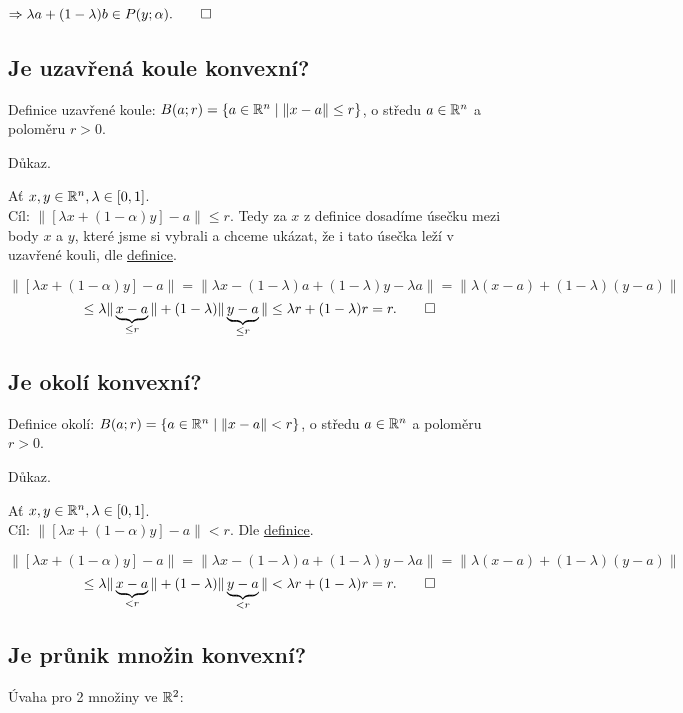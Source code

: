 $\Rightarrow \lambda a + (1-\lambda)b \in P(y; \alpha). \qed$

\subsection{Je uzavřená koule konvexní?}
Definice uzavřené koule: $B(a; r) = \left\lbrace a \in \mathbb{R}^n \mid \|x -a \| \leq r \right\rbrace$, o středu $a \in \mathbb{R}^n$ a poloměru $r > 0$.

Důkaz.

Ať $x,y \in \mathbb{R}^n, \lambda \in [0,1]$.\\
Cíl: $\| [\lambda x + (1-\alpha)y] - a \| \leq r$. Tedy za $x$ z definice dosadíme úsečku mezi body $x$ a $y$, které 
jsme si vybrali a chceme ukázat, že i tato úsečka leží v uzavřené kouli, dle \hyperref[sec:konvex]{definice}.

\[
    \| [\lambda x + (1-\alpha)y] - a \| = \| \lambda x - (1-\lambda)a + (1-\lambda)y - \lambda a \| =
    \| \lambda (x-a) + (1-\lambda)(y-a) \|
\]
\[
    \leq \lambda \|\underbrace{x-a}_{\leq r}\| +  (1-\lambda)\|\underbrace{y-a}_{\leq r}\| \leq \lambda r + (1-\lambda)r
     = r. \qed
\]

\subsection{Je okolí konvexní?}
Definice okolí: $B(a;r) = \left\lbrace a \in \mathbb{R}^n \mid \|x -a \| < r \right\rbrace$, o středu $a \in \mathbb{R}^n$ a poloměru $r > 0$.

Důkaz.

Ať $x,y \in \mathbb{R}^n, \lambda \in [0,1]$.\\
Cíl: $\| [\lambda x + (1-\alpha)y] - a \| < r$. Dle \hyperref[sec:konvex]{definice}.

\[
    \| [\lambda x + (1-\alpha)y] - a \| = \| \lambda x - (1-\lambda)a + (1-\lambda)y - \lambda a \| =
    \| \lambda (x-a) + (1-\lambda)(y-a) \|
\]
\[
    \leq \lambda \|\underbrace{x-a}_{< r}\| +  (1-\lambda)\|\underbrace{y-a}_{< r}\| < \lambda r + (1-\lambda)r
     = r. \qed
\]

\subsection{Je průnik množin konvexní?}
Úvaha pro 2 množiny ve $\mathbb{R}^2$:

\begin{wrapfigure}{r}{0.25\textwidth}
    \vspace{-6em}
    \hspace*{-2em}
\end{wrapfigure}

